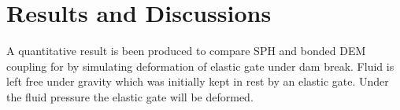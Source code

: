 \chapter{Results and Discussions}


A quantitative result is been produced to compare SPH and bonded DEM coupling
for by simulating deformation of elastic gate under dam break. Fluid is left
free under gravity which was initially kept in rest by an elastic gate. Under
the fluid pressure the elastic gate will be deformed.




